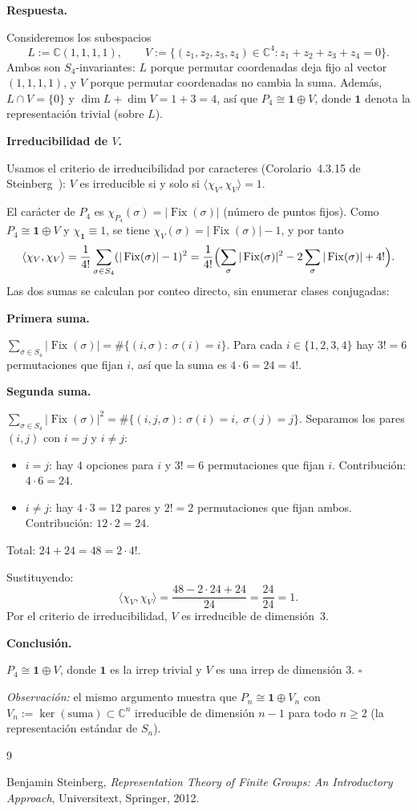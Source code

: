 \documentclass[10pt,a4paper]{article}
\newcommand{\CC}{\mathbb{C}}
\newcommand{\inlinehead}[2][repblue]{%
  \par\smallskip
  {\color{#1}\bfseries #2.}\hspace{0.45em}%
}
\newcommand{\blockhead}[2][repteal]{%
  \par\smallskip
  {\color{#1}\bfseries #2.}\par\nobreak\smallskip
}
\newcommand{\answer}{\inlinehead{Respuesta}}
\newcommand{\subhead}[1]{\blockhead{#1}}
\newcommand{\notehead}[1]{\inlinehead[repgray]{#1}}
\begin{document}
\answer
Consideremos los subespacios
\[
  L:=\CC(1,1,1,1),
  \qquad
  V:=\{(z_1,z_2,z_3,z_4)\in\CC^4:z_1+z_2+z_3+z_4=0\}.
\]
Ambos son $S_4$-invariantes: $L$ porque permutar coordenadas deja fijo
al vector $(1,1,1,1)$, y $V$ porque permutar coordenadas no cambia la suma.
Además, $L\cap V=\{0\}$ y $\dim L+\dim V=1+3=4$, así que
$P_4\cong \mathbf 1\oplus V$,
donde $\mathbf 1$ denota la representación trivial (sobre $L$).

\subhead{Irreducibilidad de $V$}
Usamos el criterio de irreducibilidad por caracteres
(Corolario~4.3.15 de Steinberg~\cite[Cor.~4.3.15]{Steinberg}):
$V$ es irreducible si y solo si $\langle\chi_V,\chi_V\rangle=1$.

El carácter de $P_4$ es $\chi_{P_4}(\sigma)=|\operatorname{Fix}(\sigma)|$
(número de puntos fijos). Como $P_4\cong\mathbf 1\oplus V$ y $\chi_{\mathbf 1}\equiv 1$,
se tiene $\chi_V(\sigma)=|\operatorname{Fix}(\sigma)|-1$, y por tanto
\[
  \langle\chi_V,\chi_V\rangle
  =\frac{1}{4!}\sum_{\sigma\in S_4}(|\operatorname{Fix}(\sigma)|-1)^2
  =\frac{1}{4!}\Bigl(\sum_{\sigma}|\operatorname{Fix}(\sigma)|^2
    -2\sum_{\sigma}|\operatorname{Fix}(\sigma)|+4!\Bigr).
\]
Las dos sumas se calculan por conteo directo, sin enumerar clases conjugadas:

\notehead{Primera suma}
$\displaystyle\sum_{\sigma\in S_4}|\operatorname{Fix}(\sigma)|
=\#\{(i,\sigma):\ \sigma(i)=i\}$.
Para cada $i\in\{1,2,3,4\}$ hay $3!=6$ permutaciones que fijan $i$,
así que la suma es $4\cdot 6=24=4!$.

\notehead{Segunda suma}
$\displaystyle\sum_{\sigma\in S_4}|\operatorname{Fix}(\sigma)|^2
=\#\{(i,j,\sigma):\ \sigma(i)=i,\;\sigma(j)=j\}$.
Separamos los pares $(i,j)$ con $i=j$ y $i\ne j$:
\begin{itemize}[nosep,leftmargin=1.5em]
\item $i=j$: hay $4$ opciones para $i$ y $3!=6$ permutaciones que fijan $i$.
Contribución: $4\cdot 6=24$.
\item $i\ne j$: hay $4\cdot 3=12$ pares y $2!=2$ permutaciones que fijan ambos.
Contribución: $12\cdot 2=24$.
\end{itemize}
Total: $24+24=48=2\cdot 4!$.

Sustituyendo:
\[
  \langle\chi_V,\chi_V\rangle
  =\frac{48-2\cdot 24+24}{24}=\frac{24}{24}=1.
\]
Por el criterio de irreducibilidad, $V$ es irreducible de dimensión~$3$.

\subhead{Conclusión}
$P_4\cong\mathbf 1\oplus V$,
donde $\mathbf 1$ es la irrep trivial y $V$ es una irrep de dimensión $3$.
\hfill$\square$

\smallskip
{\footnotesize\textit{Observación:} el mismo argumento muestra que
$P_n\cong\mathbf 1\oplus V_n$ con $V_n:=\ker(\text{suma})\subset\CC^n$
irreducible de dimensión $n-1$ para todo $n\ge 2$
(la representación estándar de $S_n$).}

\begin{thebibliography}{9}

Benjamin Steinberg,
\textit{Representation Theory of Finite Groups: An Introductory Approach},
Universitext, Springer, 2012.

\end{thebibliography}
\end{document}
